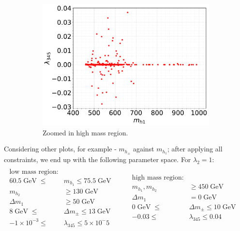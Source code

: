 \documentclass[12pt]{article}
\newcommand{\gev}{\mathrel{\text{ GeV}}}
\newcommand{\gevs}{\mathrel{\text{ GeV }}}
\newcommand{\mhone}{m_{h_1}}
\newcommand{\mhtwo}{m_{h_2}}
\newcommand{\mhp}{m_{h_\pm}}
\begin{document}
\begin{figure}[H]
\begin{subfigure}[b]{0.49\textwidth}
        \centering
        \includegraphics[width=\textwidth]{single_plots_(big_range)/l345_against_MD1_Omegah2.pdf}
        \caption{Zoomed in high mass region.}
        \label{fig:label}
    \end{subfigure}
    \caption{}
\end{figure}

Considering other plots, for example - $\mhp$ against $\mhone$; after applying all constraints, we end up with the following parameter space. For $\lambda_2 = 1$:
\begin{equation}
    {
        \begin{split}
            \\ \text{low mass region:}& 
            \\ 60.5 \gevs \leq &\mhone \leq 75.5 \gevs
            \\  \mhtwo &\geq 130 \gev
            \\  \Delta m_1 & \geq 50 \gev
            \\ 8 \gevs\leq &\Delta m_\pm \leq 13\gev
            \\ -1 \times 10 ^{-3}\leq &\lambda_{345} \leq 5 \times 10^-5
        \end{split}
        }
        \qquad
    {
        \begin{split}
            \\ \text{high mass region:}&
            \\   \mhone, \mhtwo &\geq 450 \gev
            \\   \Delta m_1 & = 0 \gev
            \\0 \gevs\leq &\Delta m_\pm \leq 10\gev
            \\ -0.03 \leq &\lambda_{345} \leq 0.04
        \end{split}
    \text{ }}
\end{equation}
\end{document}
